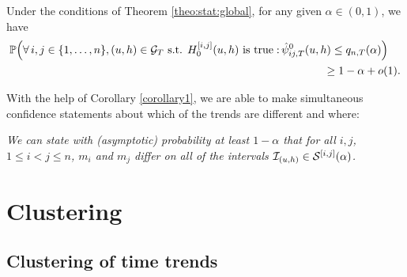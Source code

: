 \documentclass[a4paper,12pt]{article}
\begin{document}
\begin{corollary}\label{corollary1}
Under the conditions of Theorem \ref{theo:stat:global}, for any given $\alpha \in (0,1)$, we have
\begin{align*}
\mathbb{P}\Big( \forall \, i,j \in \{1, \ldots, n\}, (u, h) \in \mathcal{G}_T \text{ s.t. } H_0^{[i, j]}(u, h) \text{ is true}: & \, \hat{\psi}^0_{ij,T}(u, h) \le q_{n,T}(\alpha) \Big) \\ & \qquad \quad \quad \ge 1 - \alpha + o(1).
\end{align*}
\end{corollary} 


With the help of Corollary \ref{corollary1}, we are able to make simultaneous confidence statements about which of the trends are different and where:

\begin{center}
\begin{minipage}[c][1.25cm][c]{13cm}
\textit{We can state with (asymptotic) probability at least $1-\alpha$ that for all $i, j$, $1 \le i < j \le n$, $m_i$ and $m_j$ differ on all of the intervals $\mathcal{I}_{(u, h)} \in \mathcal{S}^{[i, j]}(\alpha)$.}
\end{minipage}
\end{center}



\section{Clustering}
\subsection{Clustering of time trends}\label{subsec-test-equality-clustering}
\end{document}
